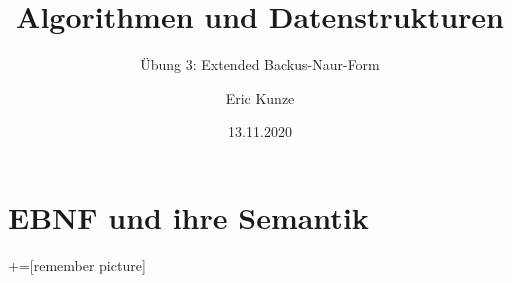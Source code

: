 \documentclass{beamer}
\begin{document}
	
	\title{Algorithmen und Datenstrukturen}
	\subtitle{Übung 3: Extended Backus-Naur-Form}
	\author{Eric Kunze}
	\date{13.11.2020}

	\maketitle



\section{EBNF und ihre Semantik}

+=[remember picture]
\end{document}

